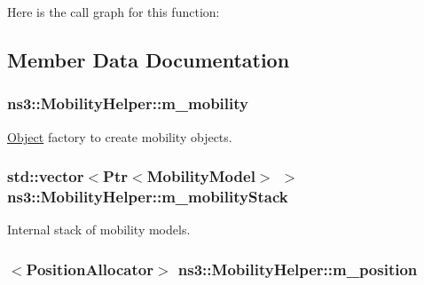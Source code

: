 Here is the call graph for this function\+:




\subsection{Member Data Documentation}
\subsubsection[{\texorpdfstring{m\+\_\+mobility}{m_mobility}}]{ ns3\+::\+Mobility\+Helper\+::m\+\_\+mobility\hspace{0.3cm}{\ttfamily [private]}}\hypertarget{classns3_1_1MobilityHelper_a4ef940485a2e5b840d1552bc5331c404}{}\label{classns3_1_1MobilityHelper_a4ef940485a2e5b840d1552bc5331c404}


\hyperlink{classns3_1_1Object}{Object} factory to create mobility objects. 

\subsubsection[{\texorpdfstring{m\+\_\+mobility\+Stack}{m_mobilityStack}}]{\setlength{\rightskip}{0pt plus 5cm}std\+::vector$<${\bf Ptr}$<${\bf Mobility\+Model}$>$ $>$ ns3\+::\+Mobility\+Helper\+::m\+\_\+mobility\+Stack\hspace{0.3cm}{\ttfamily [private]}}\hypertarget{classns3_1_1MobilityHelper_afa6de1206985c5c37610f02de43b10d2}{}\label{classns3_1_1MobilityHelper_afa6de1206985c5c37610f02de43b10d2}


Internal stack of mobility models. 

\subsubsection[{\texorpdfstring{m\+\_\+position}{m_position}}]{$<${\bf Position\+Allocator}$>$ ns3\+::\+Mobility\+Helper\+::m\+\_\+position\hspace{0.3cm}{\ttfamily [private]}}\hypertarget{classns3_1_1MobilityHelper_a93a974a210f2c818b2649fca2d24d264}{}\label{classns3_1_1MobilityHelper_a93a974a210f2c818b2649fca2d24d264}


